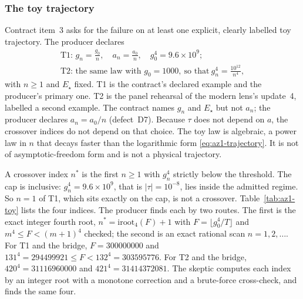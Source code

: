 \subsubsection{The toy trajectory}
\label{sec:az1-toy}
Contract item~3 asks for the failure on at least one explicit, clearly
labelled toy trajectory. The producer declares
\begin{equation}
 \begin{gathered}
 \text{T1: }g_n=\frac{g_0}n,\quad a_n=\frac{a_0}n,\quad g_0^4=9.6\times10^9;\\
 \text{T2: the same law with }g_0=1000,\ \text{so that}\ g_n^4=\frac{10^{12}}{n^4},
 \end{gathered}
 \label{eq:az1-toy}
\end{equation}
with $n\ge1$ and $E_\star$ fixed. T1 is the contract's declared example and
the producer's primary one. T2 is the panel rehearsal of the modern lens's
update~4, labelled a second example. The contract names $g_n$ and $E_\star$
but not $a_n$; the producer declares $a_n=a_0/n$ (defect~D7). Because $\tau$
does not depend on $a$, the crossover indices do not depend on that choice.
The toy law is algebraic, a power law in $n$ that decays faster than the
logarithmic form \eqref{eq:az1-trajectory}. It is not of asymptotic-freedom
form and is not a physical trajectory.

A crossover index $n^*$ is the first $n\ge1$ with $g_n^4$ strictly below the
threshold. The cap is inclusive: $g_n^4=9.6\times10^9$, that is
$|\tau|=10^{-8}$, lies inside the admitted regime. So $n=1$ of T1, which sits
exactly on the cap, is not a crossover. Table~\ref{tab:az1-toy} lists the four
indices. The producer finds each by two routes. The first is the exact
integer fourth root, $n^*=\mathrm{iroot}_4(F)+1$ with $F=\lfloor
g_0^4/T\rfloor$ and $m^4\le F<(m+1)^4$ checked; the second is an exact
rational scan $n=1,2,\ldots$. For T1 and the bridge, $F=300000000$ and
$131^4=294499921\le F<132^4=303595776$. For T2 and the bridge,
$420^4=31116960000$ and $421^4=31414372081$. The skeptic computes each index
by an integer root with a monotone correction and a brute-force cross-check,
and finds the same four.

